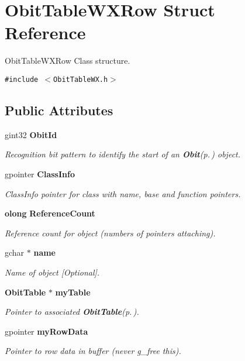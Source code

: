 \section{Obit\-Table\-WXRow Struct Reference}
\label{structObitTableWXRow}
Obit\-Table\-WXRow Class structure.  


{\tt \#include $<$Obit\-Table\-WX.h$>$}

\subsection*{Public Attributes}
\begin{CompactItemize}
\item 
gint32 {\bf Obit\-Id}
\begin{CompactList}\small\item\em Recognition bit pattern to identify the start of an {\bf Obit}{\rm (p.\,\pageref{structObit})} object. \item\end{CompactList}\item 
gpointer {\bf Class\-Info}
\begin{CompactList}\small\item\em Class\-Info pointer for class with name, base and function pointers. \item\end{CompactList}\item 
{\bf olong} {\bf Reference\-Count}
\begin{CompactList}\small\item\em Reference count for object (numbers of pointers attaching). \item\end{CompactList}\item 
gchar $\ast$ {\bf name}
\begin{CompactList}\small\item\em Name of object [Optional]. \item\end{CompactList}\item 
{\bf Obit\-Table} $\ast$ {\bf my\-Table}
\begin{CompactList}\small\item\em Pointer to associated {\bf Obit\-Table}{\rm (p.\,\pageref{structObitTable})}. \item\end{CompactList}\item 
gpointer {\bf my\-Row\-Data}
\begin{CompactList}\small\item\em Pointer to row data in buffer (never g\_\-free this). \item\end{CompactList}\item 

\end{CompactItemize}
